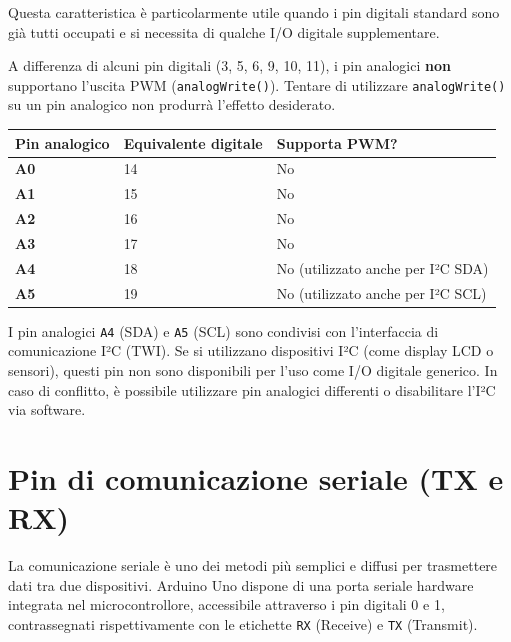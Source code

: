 Questa caratteristica è particolarmente utile quando i pin digitali standard sono già tutti occupati e si necessita di qualche I/O digitale supplementare.

\begin{tcolorbox}[colback=blue!4, colframe=blue!60, title=\textbf{Nota – PWM sui pin analogici}]
    A differenza di alcuni pin digitali (3, 5, 6, 9, 10, 11), i pin analogici \textbf{non} supportano l'uscita PWM (\texttt{analogWrite()}). Tentare di utilizzare \texttt{analogWrite()} su un pin analogico non produrrà l'effetto desiderato.
\end{tcolorbox}

\begin{center}
\begin{tabular}{>{\bfseries}l l l}
    \toprule
    Pin analogico & Equivalente digitale & Supporta PWM? \\
    \midrule
    A0 & 14 & No \\
    A1 & 15 & No \\
    A2 & 16 & No \\
    A3 & 17 & No \\
    A4 & 18 & No (utilizzato anche per I²C SDA) \\
    A5 & 19 & No (utilizzato anche per I²C SCL) \\
    \bottomrule
\end{tabular}
\end{center}

\begin{tcolorbox}[colback=red!4, colframe=red!60, title=\textbf{Attenzione – Pin A4 e A5 e comunicazione I²C}]
    I pin analogici \texttt{A4} (SDA) e \texttt{A5} (SCL) sono condivisi con l'interfaccia di comunicazione I²C (TWI). Se si utilizzano dispositivi I²C (come display LCD o sensori), questi pin non sono disponibili per l'uso come I/O digitale generico. In caso di conflitto, è possibile utilizzare pin analogici differenti o disabilitare l'I²C via software.
\end{tcolorbox}

\section{Pin di comunicazione seriale (TX e RX)}

La comunicazione seriale è uno dei metodi più semplici e diffusi per trasmettere dati tra due dispositivi. Arduino Uno dispone di una porta seriale hardware integrata nel microcontrollore, accessibile attraverso i pin digitali 0 e 1, contrassegnati rispettivamente con le etichette \texttt{RX} (Receive) e \texttt{TX} (Transmit).

